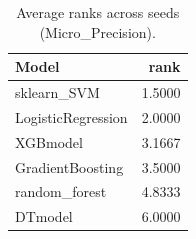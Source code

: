 \begin{table}[t]
\centering
\begin{tabular}{lr}
\toprule
Model & rank \\
\midrule
sklearn_SVM & 1.5000 \\
LogisticRegression & 2.0000 \\
XGBmodel & 3.1667 \\
GradientBoosting & 3.5000 \\
random_forest & 4.8333 \\
DTmodel & 6.0000 \\
\bottomrule
\end{tabular}
\caption{Average ranks across seeds (Micro_Precision).}
\label{tab:avg_rank_Micro_Precision}
\end{table}